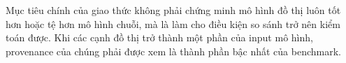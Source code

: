 \documentclass[runningheads]{llncs}
\begin{document}
Mục tiêu chính của giao thức không phải chứng minh mô hình đồ thị luôn tốt hơn hoặc tệ hơn mô hình chuỗi, mà là làm cho điều kiện so sánh trở nên kiểm toán được. Khi các cạnh đồ thị trở thành một phần của input mô hình, provenance của chúng phải được xem là thành phần bậc nhất của benchmark.



\end{document}
